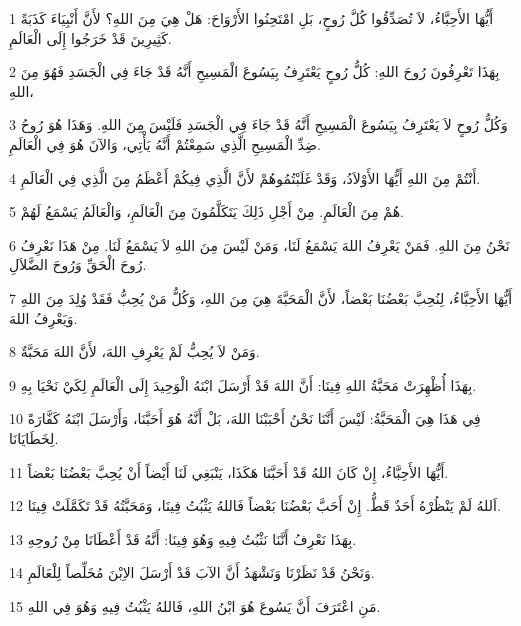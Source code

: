 \par 1 أَيُّهَا الأَحِبَّاءُ، لاَ تُصَدِّقُوا كُلَّ رُوحٍ، بَلِ امْتَحِنُوا الأَرْوَاحَ: هَلْ هِيَ مِنَ اللهِ؟ لأَنَّ أَنْبِيَاءَ كَذَبَةً كَثِيرِينَ قَدْ خَرَجُوا إِلَى الْعَالَمِ.
\par 2 بِهَذَا تَعْرِفُونَ رُوحَ اللهِ: كُلُّ رُوحٍ يَعْتَرِفُ بِيَسُوعَ الْمَسِيحِ أَنَّهُ قَدْ جَاءَ فِي الْجَسَدِ فَهُوَ مِنَ اللهِ،
\par 3 وَكُلُّ رُوحٍ لاَ يَعْتَرِفُ بِيَسُوعَ الْمَسِيحِ أَنَّهُ قَدْ جَاءَ فِي الْجَسَدِ فَلَيْسَ مِنَ اللهِ. وَهَذَا هُوَ رُوحُ ضِدِّ الْمَسِيحِ الَّذِي سَمِعْتُمْ أَنَّهُ يَأْتِي، وَالآنَ هُوَ فِي الْعَالَمِ.
\par 4 أَنْتُمْ مِنَ اللهِ أَيُّهَا الأَوْلاَدُ، وَقَدْ غَلَبْتُمُوهُمْ لأَنَّ الَّذِي فِيكُمْ أَعْظَمُ مِنَ الَّذِي فِي الْعَالَمِ.
\par 5 هُمْ مِنَ الْعَالَمِ. مِنْ أَجْلِ ذَلِكَ يَتَكَلَّمُونَ مِنَ الْعَالَمِ، وَالْعَالَمُ يَسْمَعُ لَهُمْ.
\par 6 نَحْنُ مِنَ اللهِ. فَمَنْ يَعْرِفُ اللهَ يَسْمَعُ لَنَا، وَمَنْ لَيْسَ مِنَ اللهِ لاَ يَسْمَعُ لَنَا. مِنْ هَذَا نَعْرِفُ رُوحَ الْحَقِّ وَرُوحَ الضَّلاَلِ.
\par 7 أَيُّهَا الأَحِبَّاءُ، لِنُحِبَّ بَعْضُنَا بَعْضاً، لأَنَّ الْمَحَبَّةَ هِيَ مِنَ اللهِ، وَكُلُّ مَنْ يُحِبُّ فَقَدْ وُلِدَ مِنَ اللهِ وَيَعْرِفُ اللهَ.
\par 8 وَمَنْ لاَ يُحِبُّ لَمْ يَعْرِفِ اللهَ، لأَنَّ اللهَ مَحَبَّةٌ.
\par 9 بِهَذَا أُظْهِرَتْ مَحَبَّةُ اللهِ فِينَا: أَنَّ اللهَ قَدْ أَرْسَلَ ابْنَهُ الْوَحِيدَ إِلَى الْعَالَمِ لِكَيْ نَحْيَا بِهِ.
\par 10 فِي هَذَا هِيَ الْمَحَبَّةُ: لَيْسَ أَنَّنَا نَحْنُ أَحْبَبْنَا اللهَ، بَلْ أَنَّهُ هُوَ أَحَبَّنَا، وَأَرْسَلَ ابْنَهُ كَفَّارَةً لِخَطَايَانَا.
\par 11 أَيُّهَا الأَحِبَّاءُ، إِنْ كَانَ اللهُ قَدْ أَحَبَّنَا هَكَذَا، يَنْبَغِي لَنَا أَيْضاً أَنْ يُحِبَّ بَعْضُنَا بَعْضاً.
\par 12 اَللهُ لَمْ يَنْظُرْهُ أَحَدٌ قَطُّ. إِنْ أَحَبَّ بَعْضُنَا بَعْضاً فَاللهُ يَثْبُتُ فِينَا، وَمَحَبَّتُهُ قَدْ تَكَمَّلَتْ فِينَا.
\par 13 بِهَذَا نَعْرِفُ أَنَّنَا نَثْبُتُ فِيهِ وَهُوَ فِينَا: أَنَّهُ قَدْ أَعْطَانَا مِنْ رُوحِهِ.
\par 14 وَنَحْنُ قَدْ نَظَرْنَا وَنَشْهَدُ أَنَّ الآبَ قَدْ أَرْسَلَ الاِبْنَ مُخَلِّصاً لِلْعَالَمِ.
\par 15 مَنِ اعْتَرَفَ أَنَّ يَسُوعَ هُوَ ابْنُ اللهِ، فَاللهُ يَثْبُتُ فِيهِ وَهُوَ فِي اللهِ.
